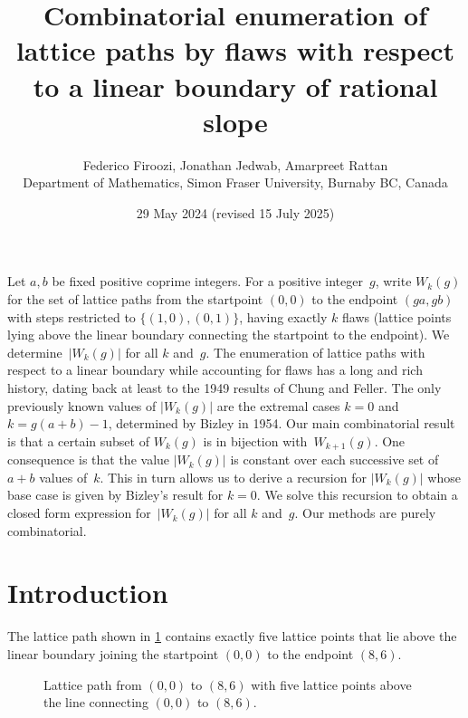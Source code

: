 \documentclass[11pt]{article}
\title{Combinatorial enumeration of lattice paths by flaws with respect to a linear boundary of rational slope}
\author{Federico Firoozi, Jonathan Jedwab, Amarpreet Rattan \\
Department of Mathematics, Simon Fraser University, Burnaby BC, Canada}
\makeatletter
\renewenvironment{abstract}{%
      \if@twocolumn
        \section*{\abstractname}%
      \else
        \small
        \begin{center}%
          {\bfseries \abstractname\vspace{-.5em}\vspace{\z@}}%
        \end{center}%
        \quotation
        \noindent\ignorespaces
      \fi
    }{%
      \if@twocolumn\else\endquotation\fi
    }
\theoremstyle{definition} %
\numberwithin{equation}{section}
\makeatother
\begin{document}
\date{29 May 2024 (revised 15 July 2025)}

\maketitle


\begin{abstract}
    Let $a,b$ be fixed positive coprime integers. For a positive integer~$g$,
    write $W_k(g)$ for the set of lattice paths from the startpoint $(0,0)$ to the endpoint $(ga,gb)$ with steps restricted to $\{(1,0), (0,1)\}$, having exactly $k$ flaws (lattice points lying above the linear boundary connecting the startpoint to the endpoint). 
    We determine~$|W_k(g)|$ for all $k$ and~$g$.
    The enumeration of lattice paths with respect to a linear boundary while accounting for flaws has a long and rich history, dating back at least to the 1949 results of Chung and Feller. 
    The only previously known values of $|W_k(g)|$ are the extremal cases $k = 0$ and $k = g(a+b)-1$, determined by Bizley in 1954. 
    Our main combinatorial result is that a certain subset of $W_k(g)$ is in bijection with~$W_{k+1}(g)$. One consequence is that the value $|W_k(g)|$ is constant over each successive set of $a+b$ values of~$k$. This in turn allows us to derive a recursion for $|W_k(g)|$ whose base case is given by Bizley's result for $k=0$. We solve this recursion to obtain a closed form expression for~$|W_k(g)|$ for all $k$ and~$g$. Our methods are purely combinatorial.
\end{abstract}


\section{Introduction}
\label{sec:intro}
The lattice path shown in \cref{fig:sample} contains exactly five lattice points that lie above the linear boundary joining the startpoint $(0,0)$ to the endpoint $(8,6)$.

\begin{figure}[H]
    \begin{center}
    \caption{Lattice path from $(0,0)$ to $(8,6)$ with five lattice points above the line connecting $(0,0)$ to $(8,6)$.}
    \label{fig:sample}
    \end{center}
\end{figure}
\end{document}

